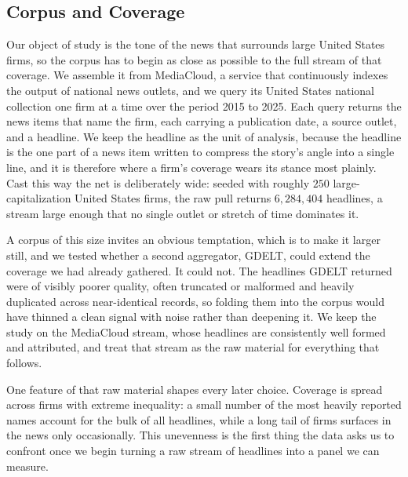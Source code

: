 \documentclass[conference]{IEEEtran}
\begin{document}
\subsection{Corpus and Coverage}
Our object of study is the tone of the news that surrounds large United States
firms, so the corpus has to begin as close as possible to the full stream of that
coverage. We assemble it from MediaCloud, a service that continuously indexes the
output of national news outlets, and we query its United States national collection
one firm at a time over the period 2015 to 2025. Each query returns the news items
that name the firm, each carrying a publication date, a source outlet, and a
headline. We keep the headline as the unit of analysis, because the headline is the
one part of a news item written to compress the story's angle into a single line,
and it is therefore where a firm's coverage wears its stance most plainly. Cast this
way the net is deliberately wide: seeded with roughly $250$ large-capitalization
United States firms, the raw pull returns $6{,}284{,}404$ headlines, a stream large
enough that no single outlet or stretch of time dominates it.

A corpus of this size invites an obvious temptation, which is to make it larger
still, and we tested whether a second aggregator, GDELT, could extend the coverage
we had already gathered. It could not. The headlines GDELT returned were of visibly
poorer quality, often truncated or malformed and heavily duplicated across
near-identical records, so folding them into the corpus would have thinned a clean
signal with noise rather than deepening it. We keep the study on the MediaCloud
stream, whose headlines are consistently well formed and attributed, and treat that
stream as the raw material for everything that follows.

One feature of that raw material shapes every later choice. Coverage is spread
across firms with extreme inequality: a small number of the most heavily reported
names account for the bulk of all headlines, while a long tail of firms surfaces in
the news only occasionally. This unevenness is the first thing the data asks us to
confront once we begin turning a raw stream of headlines into a panel we can measure.

\end{document}

